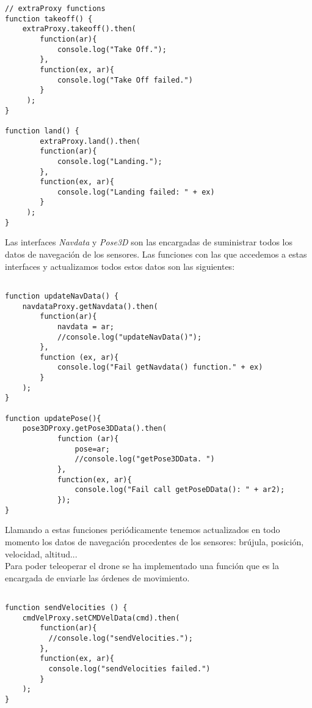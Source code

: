 \begin{lstlisting}[caption=Funciones aterrizaje y despegue.]
// extraProxy functions  
function takeoff() {
    extraProxy.takeoff().then(
        function(ar){
            console.log("Take Off.");
        },
        function(ex, ar){
            console.log("Take Off failed.")
        }
     );
}
    
function land() {
        extraProxy.land().then(
        function(ar){
            console.log("Landing.");
        },
        function(ex, ar){
            console.log("Landing failed: " + ex)
        }
     );
}
\end{lstlisting}

Las interfaces \emph{Navdata} y \emph{Pose3D} son las encargadas de suministrar todos los datos de navegación de los sensores. Las funciones con las que accedemos a estas interfaces y actualizamos todos estos datos son las siguientes:\\

\begin{lstlisting}[caption=Variables actualización datos de los sensores.]

function updateNavData() {
    navdataProxy.getNavdata().then(
        function(ar){
            navdata = ar;
            //console.log("updateNavData()");
        },
        function (ex, ar){
            console.log("Fail getNavdata() function." + ex)
        }        
    );    
}

function updatePose(){
    pose3DProxy.getPose3DData().then(
            function (ar){
                pose=ar;
                //console.log("getPose3DData. ")
            },
            function(ex, ar){
                console.log("Fail call getPoseDData(): " + ar2);
            });   
}

\end{lstlisting}


Llamando a estas funciones periódicamente tenemos actualizados en todo momento los datos de navegación procedentes de los sensores: brújula, posición, velocidad, altitud...\\

Para poder teleoperar el drone se ha implementado una función que es la encargada de enviarle las órdenes de movimiento.\\

\begin{lstlisting}[caption=Función manejadora de las órdenes.]

function sendVelocities () {
    cmdVelProxy.setCMDVelData(cmd).then(
        function(ar){
          //console.log("sendVelocities.");
        },
        function(ex, ar){
          console.log("sendVelocities failed.")
        }
    );
}

\end{lstlisting}

